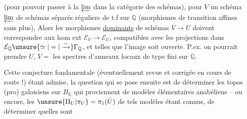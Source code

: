 (pour pouvoir passer à la $\varprojlim$ dans la catégorie des schémas), pour $V$ un schéma $\varprojlim$ de schémas séparés réguliers de t.f sur $\mathbb{Q}$ (morphismes de transition  affines sans plus), Alors les morphismes \uline{dominants} de schémas $V\longrightarrow U$ doivent correspondre aux hom ext $\mathcal{E}_V\longrightarrow\mathcal{E}_U$, compatibles avec les projections dans $\mathcal{E}_{\mathbb{Q}}\unsure{\simeq|=|\xrightarrow{\sim}}\Gamma_{\mathbb{Q}}$, et telles que l'image soit ouverte. P.ex. on pourrait prendre  $U$, \unsure{,} $V=$ les spectres d'anneaux locaux  de type fini sur $\mathbb{Q}$.


Cette conjecture fondamentale (éventuellement revue et corrigée en cours de route !) étant admise, la question qui se pose ensuite est de déterminer les topos (pro) galoisiens sur $B_{\mathbb{Q}}$ qui proviennent de modèles élémentaires anabéliens -- ou encore, les $\unsure{\Pi_U|\pi_U}=\pi_1(\bar U)$ de tels modèles étant connus, de déterminer quelles sont
